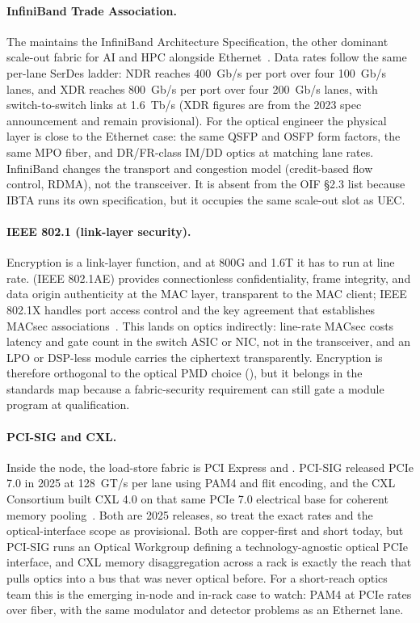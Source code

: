 \paragraph{InfiniBand Trade Association.} The  maintains the InfiniBand
Architecture Specification, the other dominant scale-out fabric for AI and HPC
alongside Ethernet~. Data rates follow the same per-lane SerDes
ladder: NDR reaches 400~Gb/s per port over four 100~Gb/s lanes, and XDR reaches
800~Gb/s per port over four 200~Gb/s lanes, with switch-to-switch links at
1.6~Tb/s (XDR figures are from the 2023 spec announcement and remain provisional).
For the optical engineer the physical layer is close to the Ethernet
case: the same QSFP and OSFP form factors, the same MPO fiber, and DR/FR-class
IM/DD optics at matching lane rates. InfiniBand changes the transport and
congestion model (credit-based flow control, RDMA), not the transceiver. It is
absent from the OIF \S2.3 list because IBTA runs its own specification, but it
occupies the same scale-out slot as UEC.

\paragraph{IEEE 802.1 (link-layer security).} Encryption is a link-layer function,
and at 800G and 1.6T it has to run at line rate.  (IEEE 802.1AE)
provides connectionless confidentiality, frame integrity, and data origin
authenticity at the MAC layer, transparent to the MAC client; IEEE 802.1X handles
port access control and the key agreement that establishes MACsec
associations~. This lands on optics indirectly: line-rate
MACsec costs latency and gate count in the switch ASIC or NIC, not in the
transceiver, and an LPO or DSP-less module carries the ciphertext transparently.
Encryption is therefore orthogonal to the optical PMD choice (),
but it belongs in the standards map because a fabric-security requirement can
still gate a module program at qualification.

\paragraph{PCI-SIG and CXL.} Inside the node, the load-store fabric is PCI Express
and . PCI-SIG released PCIe 7.0 in 2025 at 128~GT/s per lane using PAM4
and flit encoding, and the CXL Consortium built CXL 4.0 on that same PCIe 7.0
electrical base for coherent memory pooling~. Both are 2025
releases, so treat the exact rates and the optical-interface scope as provisional. Both are
copper-first and short today, but PCI-SIG runs an Optical Workgroup defining a
technology-agnostic optical PCIe interface, and CXL memory disaggregation across a
rack is exactly the reach that pulls optics into a bus that was never optical
before. For a short-reach optics team this is the emerging in-node and in-rack
case to watch: PAM4 at PCIe rates over fiber, with the same modulator and detector
problems as an Ethernet lane.

